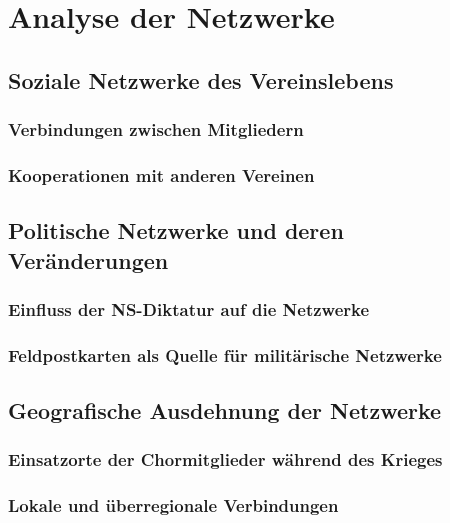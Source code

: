 \documentclass[12pt, a4paper, ngerman, bidi=default]{article}
\begin{document}
\section{Analyse der Netzwerke}
  \subsection{Soziale Netzwerke des Vereinslebens}
    \subsubsection{Verbindungen zwischen Mitgliedern}
    \subsubsection{ Kooperationen mit anderen Vereinen}
\subsection{ Politische Netzwerke und deren Veränderungen}
    \subsubsection{Einfluss der NS-Diktatur auf die Netzwerke}
    \subsubsection{Feldpostkarten als Quelle für militärische Netzwerke}
    
 \subsection{ Geografische Ausdehnung der Netzwerke}
  \subsubsection{Einsatzorte der Chormitglieder während des Krieges}
  \subsubsection{ Lokale und überregionale Verbindungen}
  \newpage
\end{document}
